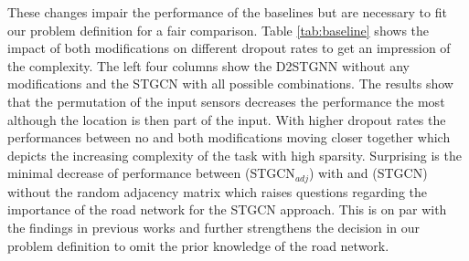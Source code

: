 These changes impair the performance of the baselines but are necessary to fit our problem definition for a fair comparison.
Table \ref{tab:baseline} shows the impact of both modifications on different dropout rates to get an impression of the complexity.
The left four columns show the D2STGNN without any modifications and the STGCN with all possible combinations.
The results show that the permutation of the input sensors decreases the performance the most although the location is then part of the input.
With higher dropout rates the performances between no and both modifications moving closer together which depicts the increasing complexity of the task with high sparsity.
Surprising is the minimal decrease of performance between (STGCN$_{adj}$) with and (STGCN) without the random adjacency matrix which raises questions regarding the importance of the road network for the STGCN approach.
This is on par with the findings in previous works \cite{Lan22, Wu2019, Bai20} and further strengthens the decision in our problem definition to omit the prior knowledge of the road network.
